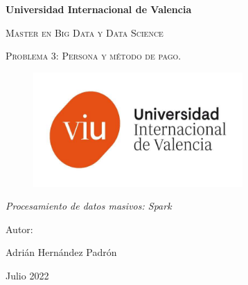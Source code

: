 \documentclass[a4paper]{article}
\begin{document}
\begin{titlepage}
    \centering
    {\bfseries\LARGE Universidad Internacional de Valencia \par}
    \vspace{1cm}
    {\scshape\Large Master en Big Data y Data Science \par}
    \vspace{3cm}
    {\scshape\Huge Problema 3: Persona y método de pago. \par}
    \vspace{1cm}
    \begin{figure}[h]
        \centering
        \includegraphics[width=8cm, keepaspectratio]{Nuevo-Logo-1.jpg}

    \end{figure}
    \vspace{1cm}
    {\itshape\Large Procesamiento de datos masivos: Spark \par}
    \vspace{3cm}
    {\Large Autor: \par}
    {\Large Adrián Hernández Padrón \par}
    {\Large Julio 2022 \par}


\end{titlepage}
\clearpage
\end{document}
